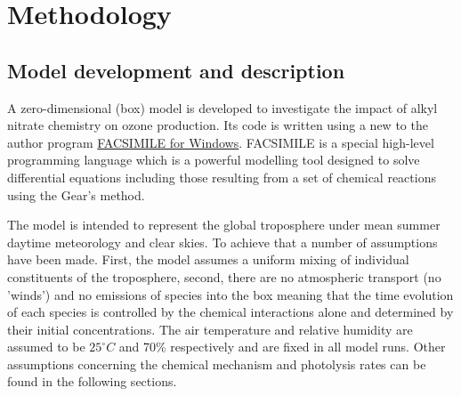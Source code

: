 \documentclass[11pt,a4paper]{article}
\begin{document}
\section{Methodology} \label{sec:method}
\subsection{Model development and description}\label{sec:method_develop}
A zero-dimensional (box) model is developed to investigate the impact of alkyl nitrate chemistry on ozone production. Its code is written using a new to the author program \href{http://www.mcpa-software.com/}{FACSIMILE for Windows}. FACSIMILE is a special high-level programming language which is a powerful modelling tool designed to solve differential equations including those resulting from a set of chemical reactions using the Gear’s method.

The model is intended to represent the global troposphere under mean summer daytime meteorology and clear skies. To achieve that a number of assumptions have been made. First, the model assumes a uniform mixing of individual constituents of the troposphere, second, there are no atmospheric transport (no 'winds') and no emissions of species into the box meaning that the time evolution of each species is controlled by the chemical interactions alone and determined by their initial concentrations. The air temperature and relative humidity are assumed to be $25^{\circ}C$ and 70\% respectively and are fixed in all model runs. Other assumptions concerning the chemical mechanism and photolysis rates can be found in the following sections.
\end{document}

